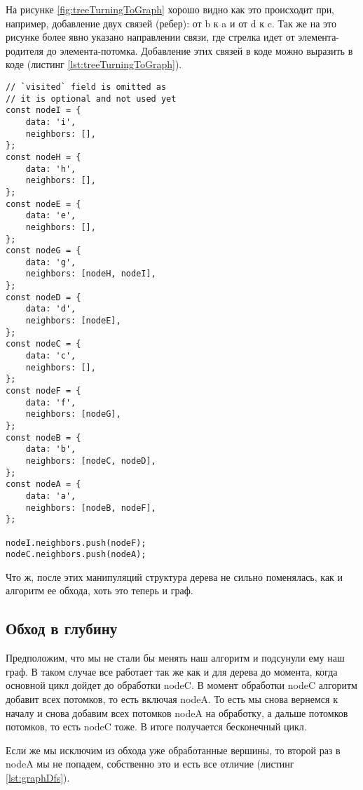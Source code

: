 \documentclass[../article.tex]{subfiles}
\begin{document}
На рисунке \ref{fig:treeTurningToGraph} хорошо видно как это происходит при, например, добавление двух связей (ребер): от {\firacodebold b} к {\firacodebold a} и от {\firacodebold d} к {\firacodebold c}. Так же на это рисунке более явно указано направлении связи, где стрелка идет от элемента-родителя до элемента-потомка. Добавление этих связей в коде можно выразить в коде (листинг \ref{lst:treeTurningToGraph}).

\begin{ruledelement}
    \begin{lstlisting}[caption={Добавление связей превращающих дерево в грфа}, label={lst:treeTurningToGraph}]
// `visited` field is omitted as
// it is optional and not used yet
const nodeI = {
    data: 'i',
    neighbors: [],
};
const nodeH = {
    data: 'h',
    neighbors: [],
};
const nodeE = {
    data: 'e',
    neighbors: [],
};
const nodeG = {
    data: 'g',
    neighbors: [nodeH, nodeI],
};
const nodeD = {
    data: 'd',
    neighbors: [nodeE],
};
const nodeC = {
    data: 'c',
    neighbors: [],
};
const nodeF = {
    data: 'f',
    neighbors: [nodeG],
};
const nodeB = {
    data: 'b',
    neighbors: [nodeC, nodeD],
};
const nodeA = {
    data: 'a',
    neighbors: [nodeB, nodeF],
};

nodeI.neighbors.push(nodeF);
nodeC.neighbors.push(nodeA);
    \end{lstlisting}
\end{ruledelement}


Что ж, после этих манипуляций структура дерева не сильно поменялась, как и алгоритм ее обхода, хоть это теперь и граф.

\subsection{Обход в глубину}

Предположим, что мы не стали бы менять наш алгоритм и подсунули ему наш граф. В таком случае все работает так же как и для дерева до момента, когда основной цикл дойдет до обработки {\firacodebold nodeC}. В момент обработки {\firacodebold nodeC} алгоритм добавит всех потомков, то есть включая {\firacodebold nodeA}. То есть мы снова вернемся к началу и снова добавим всех потомков {\firacodebold nodeA} на обработку, а дальше потомков потомков, то есть {\firacodebold nodeC} тоже. В итоге получается бесконечный цикл.

Если же мы исключим из обхода уже обработанные вершины, то второй раз в {\firacodebold nodeA} мы не попадем, собственно это и есть все отличие (листинг \ref{lst:graphDfs}).
\end{document}
